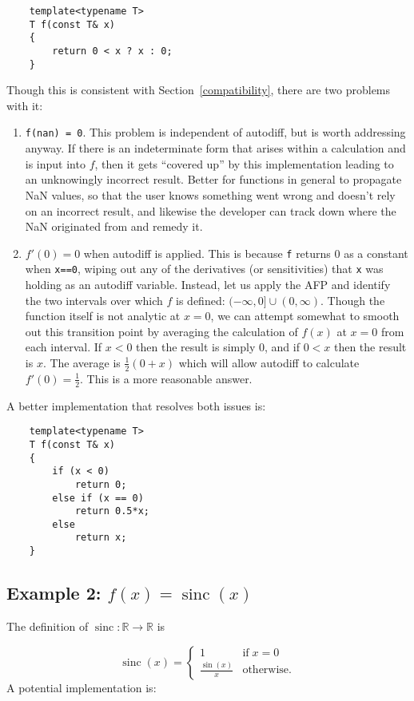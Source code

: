 \documentclass{article}
\DeclareMathOperator{\sinc}{sinc}
\begin{document}
\begin{verbatim}
    template<typename T>
    T f(const T& x)
    {
        return 0 < x ? x : 0;
    }
\end{verbatim}
Though this is consistent with Section~\ref{compatibility}, there are two problems with it:

\begin{enumerate}
\item {\tt f(nan) = 0}. This problem is independent of autodiff, but is worth addressing anyway. If there is
    an indeterminate form that arises within a calculation and is input into $f$, then it gets ``covered up'' by
    this implementation leading to an unknowingly incorrect result. Better for functions in general to propagate
    NaN values, so that the user knows something went wrong and doesn't rely on an incorrect result, and likewise
    the developer can track down where the NaN originated from and remedy it.
\item $f'(0) = 0$ when autodiff is applied. This is because {\tt f} returns 0 as a constant when {\tt x==0}, wiping
    out any of the derivatives (or sensitivities) that {\tt x} was holding as an autodiff variable. Instead, let us
    apply the AFP and identify the two intervals over which $f$ is defined: $(-\infty,0]\cup(0,\infty)$.
    Though the function itself is not analytic at $x=0$, we can attempt somewhat to smooth out this transition
    point by averaging the calculation of $f(x)$ at $x=0$ from each interval. If $x<0$ then the result is simply
    0, and if $0<x$ then the result is $x$. The average is $\frac{1}{2}(0 + x)$ which will allow autodiff to
    calculate $f'(0)=\frac{1}{2}$. This is a more reasonable answer.
\end{enumerate}
A better implementation that resolves both issues is:
\begin{verbatim}
    template<typename T>
    T f(const T& x)
    {
        if (x < 0)
            return 0;
        else if (x == 0)
            return 0.5*x;
        else
            return x;
    }
\end{verbatim}

\subsection{Example 2: $f(x)=\sinc(x)$}

The definition of $\sinc:\mathbb{R}\rightarrow\mathbb{R}$ is

\[
\sinc(x) = \begin{cases}
    1 &\text{if}\; x = 0 \\
    \frac{\sin(x)}{x} &\text{otherwise.}\end{cases}
\]
A potential implementation is:
\end{document}
